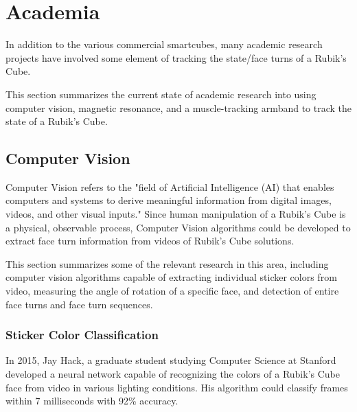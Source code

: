 \section{Academia}
\label{sec:academia}
In addition to the various commercial smartcubes, many academic research projects have involved some element of tracking the state/face turns of a Rubik's Cube.

This section summarizes the current state of academic research into using computer vision, magnetic resonance, and a muscle-tracking armband to track the state of a Rubik's Cube.


\subsection{Computer Vision}
\label{subsec:computer-vision}
Computer Vision refers to the "field of Artificial Intelligence (AI) that enables computers and systems to derive meaningful information from digital images, videos, and other visual inputs." \cite{ibm-cv-definition}
Since human manipulation of a Rubik's Cube is a physical, observable process, Computer Vision algorithms could be developed to extract face turn information from videos of Rubik's Cube solutions.

This section summarizes some of the relevant research in this area, including computer vision algorithms capable of extracting individual sticker colors from video, measuring the angle of rotation of a specific face, and detection of entire face turns and face turn sequences.

\subsubsection{Sticker Color Classification}
In 2015, Jay Hack, a graduate student studying Computer Science at Stanford developed a neural network capable of recognizing the colors of a Rubik's Cube face from video in various lighting conditions.
His algorithm could classify frames within 7 milliseconds with 92\% accuracy. \cite{hackrubik}

